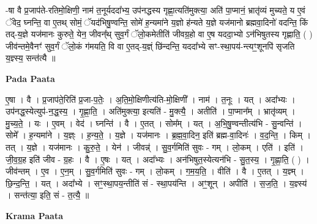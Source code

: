 \documentclass[17pt]{extarticle}
\begin{document}
-षा वै प्र॒जाप॑ते-रतिमो॒क्षिणी॒ नाम॑ त॒नूर्यददा᳚भ्य॒ उप॑नद्धस्य गृह्णा॒त्यति॑मुक्त्या॒ अति॑ पा॒प्मानं॒ भ्रातृ॑व्यं मुच्यते॒ य ए॒वं ॅवेद॒ घ्नन्ति॒ वा ए॒तथ् सोमं॒ ॅयद॑भिषु॒ण्वन्ति॒ सोमे॑ ह॒न्यमा॑ने य॒ज्ञो ह॑न्यते य॒ज्ञे यज॑मानो ब्रह्मवा॒दिनो॑ वदन्ति॒ किं तद्-य॒ज्ञे यज॑मानः कुरुते॒ येन॒ जीवन्᳚थ् सुव॒र्गं ॅलो॒कमेतीति॑ जीवग्र॒हो वा ए॒ष यददा॒भ्यो ऽन॑भिषुतस्य गृह्णाति॒ ( ) जीव॑न्तमे॒वैनꣳ॑ सुव॒र्गं ॅलो॒कं ग॑मयति॒ वि वा ए॒तद्-य॒ज्ञ्ं छि॑न्दन्ति॒ यददा᳚भ्ये सꣳ-स्था॒पय॑-न्त्यꣳ॒॒शूनपि॑ सृजति य॒ज्ञ्स्य॒ सन्त॑त्यै ॥ \newline

\textbf{Pada Paata} \newline

ए॒षा । वै । प्र॒जाप॑ते॒रिति॑ प्र॒जा-प॒तेः॒ । अ॒ति॒मो॒क्षिणीत्य॑ति-मो॒क्षिणी᳚ । नाम॑ । त॒नूः । यत् । अदा᳚भ्यः । उप॑नद्ध॒स्येत्युप॑-न॒द्ध॒स्य॒ । गृ॒ह्णा॒ति॒ । अति॑मुक्त्या॒ इत्यति॑ - मु॒क्त्यै॒ । अतीति॑ । पा॒प्मान᳚म् । भ्रातृ॑व्यम् । मु॒च्य॒ते॒ । यः । ए॒वम् । वेद॑ । घ्नन्ति॑ । वै । ए॒तत् । सोम᳚म् । यत् । अ॒भि॒षु॒ण्वन्तीत्य॑भि - सु॒न्वन्ति॑ । सोमे᳚ । ह॒न्यमा॑ने । य॒ज्ञ्ः । ह॒न्य॒ते॒ । य॒ज्ञे । यज॑मानः । ब्र॒ह्म॒वा॒दिन॒ इति॑ ब्रह्म-वा॒दिनः॑ । व॒द॒न्ति॒ । किम् । तत् । य॒ज्ञे । यज॑मानः । कु॒रु॒ते॒ । येन॑ । जीवन्न्॑ । सु॒व॒र्गमिति॑ सुवः - गम् । लो॒कम् । एति॑ । इति॑ । जी॒व॒ग्र॒ह इति॑ जीव - ग्र॒हः । वै । ए॒षः । यत् । अदा᳚भ्यः । अन॑भिषुत॒स्येत्यन॑भि - सु॒त॒स्य॒ । गृ॒ह्णा॒ति॒ ( ) । जीव॑न्तम् । ए॒व । ए॒न॒म् । सु॒व॒र्गमिति॑ सुवः - गम् । लो॒कम् । ग॒म॒य॒ति॒ । वीति॑ । वै । ए॒तत् । य॒ज्ञ्म् । छि॒न्द॒न्ति॒ । यत् । अदा᳚भ्ये । सꣳ॒॒स्था॒पय॒न्तीति॑ सं - स्था॒पय॑न्ति । अꣳ॒॒शून् । अपीति॑ । स॒ज॒ति॒ । य॒ज्ञ्स्य॑ । सन्त॑त्या॒ इति॒ सं - त॒त्यै॒ ॥  \newline


\textbf{Krama Paata} \newline
\end{document}
